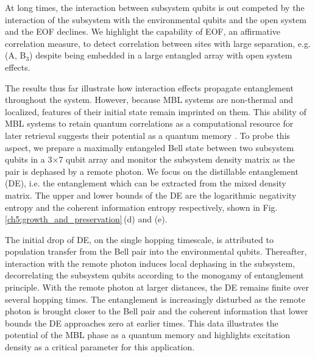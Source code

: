 At long times, the interaction between subsystem qubits is out competed by the interaction of the subsystem with the environmental qubits and the open system and the EOF declines.  We highlight the capability of EOF, an affirmative correlation measure, to detect correlation between sites with large separation, e.g. (A, B$_3$) despite being embedded in a large entangled array with open system effects.


The results thus far illustrate how interaction effects propagate entanglement throughout the system.  However, because MBL systems are non-thermal and localized, features of their initial state remain imprinted on them.  This ability of MBL systems to retain quantum correlations as a computational resource for later retrieval suggests their potential as a quantum memory \cite{Huse2014, Moore2015, Cirac2017}.  To probe this aspect, we prepare a maximally entangeled Bell state between two subsystem qubits in a 3$\times$7 qubit array and monitor the subsystem density matrix as the pair is dephased by a remote photon. %
We focus on the distillable entanglement (DE), i.e. the entanglement which can be extracted from the mixed density matrix.  The upper and lower bounds of the DE are the logarithmic negativity entropy and the coherent information entropy respectively, shown in Fig.\,\ref{ch5:growth_and_preservation}\,(d) and (e).

The initial drop of DE, on the single hopping timescale, is attributed to population transfer from the Bell pair into the environmental qubits. Thereafter, interaction with the remote photon induces local dephasing in the subsystem, decorrelating the subsystem qubits according to the monogamy of entanglement principle.  With the remote photon at larger distances, the DE remains finite over several hopping times.  The entanglement is increasingly disturbed as the remote photon is brought closer to the Bell pair and the coherent information that lower bounds the DE approaches zero at earlier times.  This data illustrates the potential of the MBL phase as a quantum memory and highlights excitation density as a critical parameter for this application.

\vspace{1em}

